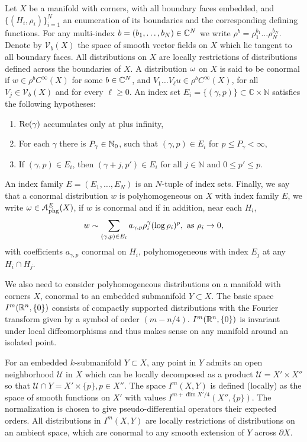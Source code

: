 \begin{defn}\label{phg}
Let $X$ be a manifold with corners, with all boundary faces embedded, and $\{(H_i,\rho_i)\}_{i=1}^N$ an enumeration 
of its boundaries and the corresponding defining functions. For any multi-index $b= (b_1,
\ldots, b_N)\in \mathbb{C}^N$ we write $\rho^b = \rho_1^{b_1} \ldots \rho_N^{b_N}$.  Denote by $\mathcal{V}_b(X)$ the space
of smooth vector fields on $X$ which lie
tangent to all boundary faces. All distributions on $X$ are locally restrictions of distributions 
defined across the boundaries of $X$. A distribution $\mathrm{\omega}$ on $X$ is said to be conormal
if $w\in \rho^b C^\infty(X)$ for some $b\in \mathbb{C}^N$, and 
$V_1 \ldots V_\ell u \in \rho^b C^\infty(X)$, for all $V_j \in \mathcal{V}_b(X)$ 
and for every $\ell \geq 0$. An index set 
$E_i = \{(\gamma,p)\} \subset {\mathbb C} \times {\mathbb N}$ 
satisfies the following hypotheses:
\begin{enumerate}
\item $\textup{Re}(\gamma)$ accumulates only at plus infinity,
\item For each $\gamma$ there is $P_{\gamma}\in \mathbb{N}_0$, such 
that $(\gamma,p)\in E_i$ for $p \leq P_\gamma < \infty$,
\item If $(\gamma,p) \in E_i$, then $(\gamma+j,p') \in E_i$ for all $j \in {\mathbb N}$ and $0 \leq p' \leq p$. 
\end{enumerate}
An index family $E = (E_1, \ldots, E_N)$ is an $N$-tuple of index sets. 
Finally, we say that a conormal distribution $w$ is polyhomogeneous on $X$ 
with index family $E$, we write $\mathrm{\omega}\in \mathcal{A}_{\textup{phg}}^E(X)$, 
if $w$ is conormal and if in addition, near each $H_i$, 
\begin{align}\label{A}
w \sim \sum_{(\gamma,p) \in E_i} a_{\gamma,p} \rho_i^{\gamma} (\log \rho_i)^p, \ 
\textup{as} \ \rho_i\to 0,
\end{align}
with coefficients $a_{\gamma,p}$ conormal on $H_i$, polyhomogeneous with index $E_j$
at any $H_i\cap H_j$. 
\end{defn}

We also need to consider polyhomogeneous distributions on a manifold with corners $X$, 
conormal to an embedded submanifold $Y\subset X$. 
The basic space $I^m(\mathbb{R}^n, \{0\})$ consists of compactly supported 
distributions with the Fourier transform given by a symbol of order $(m-n/4)$. 
$I^m(\mathbb{R}^n, \{0\})$ is invariant under
local diffeomorphisms and thus makes sense on any manifold around an isolated point.
 
For an embedded $k$-submanifold $Y\subset X$, any point in $Y$ admits 
an open neighborhood $\mathscr{U}$ in $X$ which can be 
locally decomposed as a product $\mathscr{U}=X' \times X''$
so that $\mathscr{U} \cap Y= X' \times \{p\}, p \in X''$. The
space $I^m(X,Y)$ is defined (locally) as the space of smooth functions on $X'$ 
with values $I^{m+\dim X' /4}(X'',\{p\})$.
The normalization is chosen to give pseudo-differential
operators their expected orders. All distributions in $I^m(X,Y)$ are locally restrictions of distributions
on an ambient space, which are conormal to any smooth extension of $Y$ across $\partial X$.

